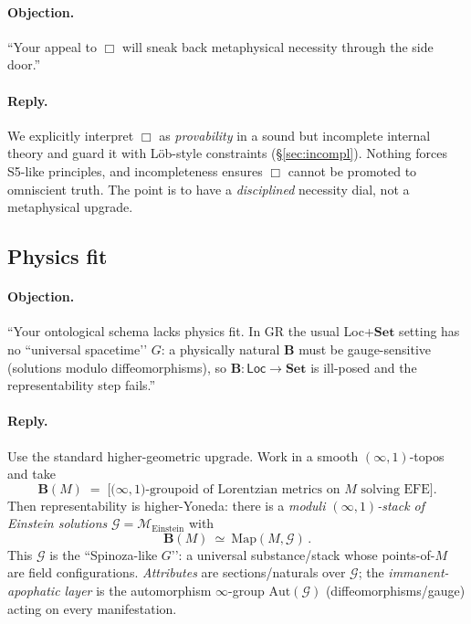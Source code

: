\documentclass[11pt]{article}
\theoremstyle{upright}
\begin{document}
\paragraph{Objection.}
“Your appeal to \(\Box\) will sneak back metaphysical necessity through the side door.”

\paragraph{Reply.}
We explicitly interpret \(\Box\) as \emph{provability} in a sound but incomplete internal theory and guard it with Löb-style constraints (\S\ref{sec:incompl}). Nothing forces S5-like principles, and incompleteness ensures \(\Box\) cannot be promoted to omniscient truth. The point is to have a \emph{disciplined} necessity dial, not a metaphysical upgrade.

\subsection{Physics fit}
\paragraph{Objection.}
“Your ontological schema lacks physics fit. In GR the usual \textsf{Loc}+\(\mathbf{Set}\) setting has no “universal spacetime’’ \(G\): a physically natural \(\mathbf B\) must be gauge-sensitive (solutions modulo diffeomorphisms), so \(\mathbf B\!:\textsf{Loc}\!\to\!\mathbf{Set}\) is ill-posed and the representability step fails.”

\paragraph{Reply.}
Use the standard higher-geometric upgrade. Work in a smooth \((\infty,1)\)-topos and take
\[
\mathbf B(M)\;=\;\big[\text{(}\infty,1\text{)-groupoid of Lorentzian metrics on }M\text{ solving EFE}\big].
\]
Then representability is higher-Yoneda: there is a \emph{moduli \((\infty,1)\)-stack of Einstein solutions} \(\mathcal G=\mathcal M_{\mathrm{Einstein}}\) with
\[
\mathbf B(M)\ \simeq\ \mathrm{Map}(M,\mathcal G)\,.
\]
This \(\mathcal G\) is the “Spinoza-like \(G\)’’: a universal substance/stack whose points-of-\(M\) are field configurations. \emph{Attributes} are sections/naturals over \(\mathcal G\); the \emph{immanent-apophatic layer} is the automorphism \(\infty\)-group \(\mathrm{Aut}(\mathcal G)\) (diffeomorphisms/gauge) acting on every manifestation. 
\end{document}
